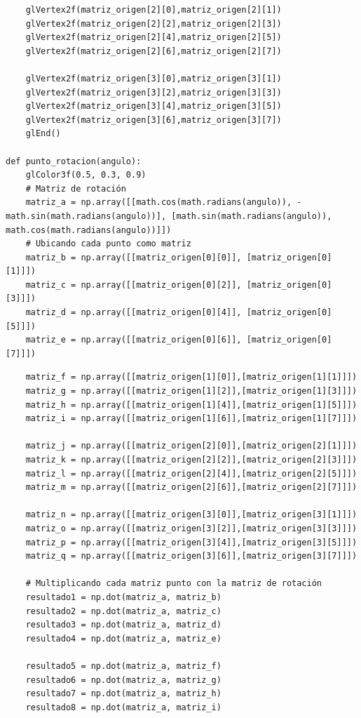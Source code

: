\documentclass[a4paper]{article}
\begin{document}
\begin{center}
\begin{mycodeboxl}
\begin{lstlisting}
    glVertex2f(matriz_origen[2][0],matriz_origen[2][1])
    glVertex2f(matriz_origen[2][2],matriz_origen[2][3])
    glVertex2f(matriz_origen[2][4],matriz_origen[2][5])
    glVertex2f(matriz_origen[2][6],matriz_origen[2][7])

    glVertex2f(matriz_origen[3][0],matriz_origen[3][1])
    glVertex2f(matriz_origen[3][2],matriz_origen[3][3])
    glVertex2f(matriz_origen[3][4],matriz_origen[3][5])
    glVertex2f(matriz_origen[3][6],matriz_origen[3][7])
    glEnd()

def punto_rotacion(angulo):
    glColor3f(0.5, 0.3, 0.9)
    # Matriz de rotación
    matriz_a = np.array([[math.cos(math.radians(angulo)), -math.sin(math.radians(angulo))], [math.sin(math.radians(angulo)), math.cos(math.radians(angulo))]])
    # Ubicando cada punto como matriz 
    matriz_b = np.array([[matriz_origen[0][0]], [matriz_origen[0][1]]])
    matriz_c = np.array([[matriz_origen[0][2]], [matriz_origen[0][3]]])
    matriz_d = np.array([[matriz_origen[0][4]], [matriz_origen[0][5]]])
    matriz_e = np.array([[matriz_origen[0][6]], [matriz_origen[0][7]]])
\end{lstlisting}
\end{mycodeboxl}
\end{center}
\newpage
\begin{center}
\begin{mycodeboxl}
\begin{lstlisting}
    matriz_f = np.array([[matriz_origen[1][0]],[matriz_origen[1][1]]])
    matriz_g = np.array([[matriz_origen[1][2]],[matriz_origen[1][3]]])
    matriz_h = np.array([[matriz_origen[1][4]],[matriz_origen[1][5]]])
    matriz_i = np.array([[matriz_origen[1][6]],[matriz_origen[1][7]]])

    matriz_j = np.array([[matriz_origen[2][0]],[matriz_origen[2][1]]])
    matriz_k = np.array([[matriz_origen[2][2]],[matriz_origen[2][3]]])
    matriz_l = np.array([[matriz_origen[2][4]],[matriz_origen[2][5]]])
    matriz_m = np.array([[matriz_origen[2][6]],[matriz_origen[2][7]]])

    matriz_n = np.array([[matriz_origen[3][0]],[matriz_origen[3][1]]])
    matriz_o = np.array([[matriz_origen[3][2]],[matriz_origen[3][3]]])
    matriz_p = np.array([[matriz_origen[3][4]],[matriz_origen[3][5]]])
    matriz_q = np.array([[matriz_origen[3][6]],[matriz_origen[3][7]]])

    # Multiplicando cada matriz punto con la matriz de rotación 
    resultado1 = np.dot(matriz_a, matriz_b)
    resultado2 = np.dot(matriz_a, matriz_c)
    resultado3 = np.dot(matriz_a, matriz_d)
    resultado4 = np.dot(matriz_a, matriz_e)

    resultado5 = np.dot(matriz_a, matriz_f)
    resultado6 = np.dot(matriz_a, matriz_g)
    resultado7 = np.dot(matriz_a, matriz_h)
    resultado8 = np.dot(matriz_a, matriz_i)
\end{lstlisting}
\end{mycodeboxl}
\end{center}
\end{document}
